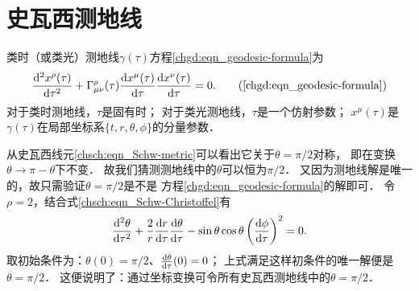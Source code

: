 \section{史瓦西测地线}



类时（或类光）测地线$\gamma(\tau)$方程\eqref{chgd:eqn_geodesic-formula}为
\begin{equation}
    \frac{{\rm d}^2 x^\rho(\tau)}{{\rm d}\tau^2} + \Gamma_{\mu\nu}^\rho(\tau)
    \frac{{\rm d}x^\mu(\tau)}{{\rm d} \tau} \frac{{\rm d}x^\nu(\tau)}{{\rm d} \tau} =0.
    \tag{\ref{chgd:eqn_geodesic-formula}}
\end{equation}
对于类时测地线，$\tau$是固有时；
对于类光测地线，$\tau$是一个仿射参数；
$x^\mu(\tau)$是$\gamma(\tau)$在局部坐标系$\{t,r,\theta,\phi\}$的分量参数．

从史瓦西线元\eqref{chsch:eqn_Schw-metric}可以看出它关于$\theta=\pi/2$对称，
即在变换$\theta \to \pi -\theta$下不变．
故我们猜测测地线中的$\theta$可以恒为$\pi/2$．
又因为测地线解是唯一的，故只需验证$\theta=\pi/2$是不是
方程\eqref{chgd:eqn_geodesic-formula}的解即可．
令$\rho=2$，结合式\eqref{chsch:eqn_Schw-Christoffel}有
\begin{equation}
    \frac{{\rm d}^2 \theta}{{\rm d}\tau^2} 
    + \frac{2}{r} \frac{{\rm d}r}{{\rm d} \tau}  \frac{{\rm d}\theta}{{\rm d} \tau} 
    -\sin\theta \cos\theta \left(\frac{{\rm d} \phi}{{\rm d} \tau} \right)^2=0.
\end{equation}
取初始条件为：$\theta(0)=\pi/2$、$\frac{{\rm d}\theta}{{\rm d} \tau}(0)=0$；
上式满足这样初条件的唯一解便是$\theta=\pi/2$．
这便说明了：通过坐标变换可令所有史瓦西测地线中的$\theta=\pi/2$．


